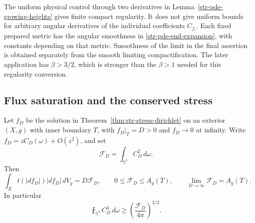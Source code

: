 \begin{remark}\label{str-pde-uniformity-scope}
The uniform physical control through two derivatives in
Lemma~\ref{str-pde-growing-heights} gives finite compact
regularity. It does not give uniform bounds for arbitrary
angular derivatives of the individual coefficients $C_{f_i}$.
Each fixed prepared metric has the angular smoothness in
\eqref{str-pde-end-expansion}, with constants depending on
that metric. Smoothness of the limit in the final assertion
is obtained separately from the smooth limiting
compactification. The later application has $\beta>3/2$,
which is stronger than the $\beta>1$ needed for this
regularity conversion.
\end{remark}

\subsection{Flux saturation and the conserved stress}

\begin{lemma}
\label{lem:str-flux-saturation}
Let $f_D$ be the solution in Theorem~\ref{thm:str-stress-dirichlet}
on an exterior $(X,g)$ with inner boundary $T$, with
$f_D|_T=D>0$ and $f_D\to0$ at infinity. Write
$f_D=zC_D(\omega)+O(z^2)$, and set
\[
 \mathcal F_D=\int_{\mathbb S^2} C_D^2\,d\omega.
\]
Then
\begin{equation}
 \int_X t(|df_D|)|df_D|\,dV_g=D\mathcal F_D,
 \qquad 0\leq\mathcal F_D\leq A_g(T),
 \qquad \lim_{D\to\infty}\mathcal F_D=A_g(T).
 \label{eq:str-flux-saturation}
\end{equation}
In particular
\begin{equation}
 \fint_{\mathbb S^2}C_D^3\,d\omega
 \geq\left(\frac{\mathcal F_D}{4\pi}\right)^{3/2}.
 \label{eq:str-jensen}
\end{equation}
\end{lemma}

